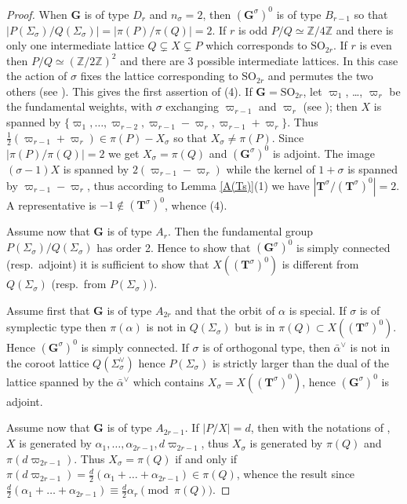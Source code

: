 \documentclass{amsart}
\numberwithin{equation}{section}
\theoremstyle{definition}
\theoremstyle{remark}
\newcommand\bG{{\mathbf G}}
\newcommand\bT{{\mathbf T}}
\newcommand\BZ{{\mathbb Z}}
\newcommand\Gs{{\bG^\sigma}}
\newcommand\Gso{{(\Gs)^0}}
\newcommand\Tso{{(\bT^\sigma)^0}}
\newcommand\Ts{{\bT^\sigma}}
\newcommand\SO{\mathrm{SO}}
\begin{document}
\begin{proof}
When   $\bG$  is  of  type   $D_{r}$  and  $n_\sigma =2$,  then $\Gso$ is of
type $B_{r-1}$ so that $|P(\Sigma_\sigma)/Q(\Sigma_\sigma)|=|\pi(P)/\pi(Q)|=2$.
If  $r$  is  odd
$P/Q\simeq\BZ/4\BZ$ and there is only one intermediate lattice $Q\subsetneq
X\subsetneq  P$ which  corresponds to  $\SO_{2r}$. If  $r$ is even then
$P/Q\simeq(\BZ/2\BZ)^2$  and there are 3 possible intermediate lattices. In
this  case  the  action  of  $\sigma$  fixes  the  lattice corresponding to
$\SO_{2r}$  and permutes  the two  others (see \cite[page 31]{deriziotis}).
This  gives the first assertion of  (4). If $\bG=\SO_{2r}$, let $\varpi_1$,
\dots,  $\varpi_r$  be  the  fundamental  weights,  with $\sigma$ exchanging
$\varpi_{r-1}$  and $\varpi_r$  (see \cite[Planche  IV, p.\ 256--257]{Bou});
then    $X$    is    spanned    by    $\{\varpi_1,\ldots,\varpi_{r-2},
\varpi_{r-1}-\varpi_r,\varpi_{r-1}+\varpi_r\}$. Thus
$\frac1 2(\varpi_{r-1}+\varpi_r)\in\pi(P)-X_\sigma$ so that
$X_\sigma\neq\pi(P)$.  Since $|\pi(P)/\pi(Q)|=2$  we get $X_\sigma=\pi(Q)$
and $\Gso$ is adjoint. The image $(\sigma-1)X$ is spanned by
$2(\varpi_{r-1}-\varpi_{r})$ while the kernel of $1+\sigma$ is spanned
by $\varpi_{r-1}-\varpi_{r}$, thus according to Lemma \ref{A(Ts)}(1) we have
$|\Ts/\Tso|=2$. A representative is $-1\notin\Tso$, whence (4).

Assume  now  that  $\bG$  is  of  type $A_r$. Then the fundamental group
$P(\Sigma_\sigma)/Q(\Sigma_\sigma)$  has order 2. Hence to show that $\Gso$
is  simply  connected  (resp.~adjoint)  it  is  sufficient  to  show that
$X(\Tso)$ is different from $Q(\Sigma_\sigma)$ (resp.~from
$P(\Sigma_\sigma)$).  


Assume first that $\bG$ is of type $A_{2r}$ and that the orbit of $\alpha$ is
special.  If $\sigma$  is of  symplectic type  then $\pi(\alpha)$ is not in
$Q(\Sigma_\sigma)$  but is in $\pi(Q)\subset X(\Tso)$.
Hence $\Gso$ is simply connected.
If  $\sigma$ is  of orthogonal  type, then  $\bar\alpha^\vee$ is not in the
coroot lattice $Q(\Sigma_\sigma^\vee)$
hence $P(\Sigma_\sigma)$ is strictly
larger  than the dual of the lattice spanned by the $\bar\alpha^\vee$ which
contains $X_\sigma=X(\Tso)$, hence $\Gso$ is adjoint.

Assume now that $\bG$  is of type  $A_{2r-1}$. If $|P/X|=d$, then
with  the  notations  of  \cite[Planche  I]{Bou},  $X$ is generated by
$\alpha_1,\ldots,\alpha_{2r-1},d\varpi_{2r-1}$,   thus   $X_\sigma$   is
generated by $\pi(Q)$ and $\pi(d\varpi_{2r-1})$. Thus $X_\sigma=\pi(Q)$ if and
only if $\pi(d\varpi_{2r-1})=\frac
d2(\alpha_1+\ldots+\alpha_{2r-1})\in\pi(Q)$, whence the result since $\frac
d2(\alpha_1+\ldots+\alpha_{2r-1})\equiv \frac d2\alpha_r\pmod{\pi(Q)}$.


\end{proof}
\end{document}
